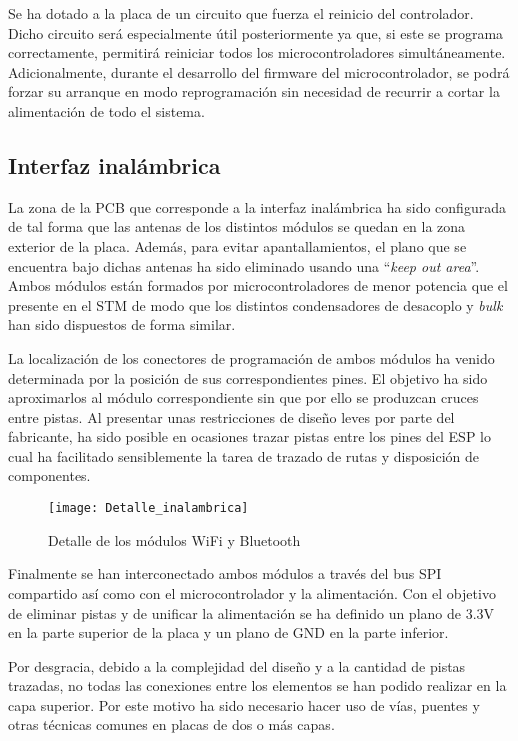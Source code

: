 Se ha dotado a la placa de un circuito que fuerza el reinicio del controlador. Dicho circuito será especialmente útil posteriormente ya que, si este se programa correctamente, permitirá reiniciar todos los microcontroladores simultáneamente. Adicionalmente, durante el desarrollo del firmware del microcontrolador, se podrá forzar su arranque en modo reprogramación sin necesidad de recurrir a cortar la alimentación de todo el sistema.

\subsection{Interfaz inalámbrica\label{sec:PCB_inalambrica}}

La zona de la \acrshort{PCB} que corresponde a la interfaz inalámbrica ha sido configurada de tal forma que las antenas de los distintos módulos se quedan en la zona exterior de la placa. Además, para evitar apantallamientos, el plano que se encuentra bajo dichas antenas ha sido eliminado usando una ``\textit{keep out area}''. Ambos módulos están formados por microcontroladores de menor potencia que el presente en el STM de modo que los distintos condensadores de desacoplo y \textit{bulk} han sido dispuestos de forma similar.

La localización de los conectores de programación de ambos módulos ha venido determinada por la posición de sus correspondientes pines. El objetivo ha sido aproximarlos al módulo correspondiente sin que por ello se produzcan cruces entre pistas. Al presentar unas restricciones de diseño leves por parte del fabricante, ha sido posible en ocasiones trazar pistas entre los pines del ESP lo cual ha facilitado sensiblemente la tarea de trazado de rutas y disposición de componentes.

\clearpage

\begin{figure} [h]
    \centering
    \texttt{[image: Detalle\_inalambrica]}
    \caption{Detalle de los módulos WiFi y Bluetooth}
    \label{fig:Detalle_inalambrica}
\end{figure}

Finalmente se han interconectado ambos módulos a través del bus SPI compartido así como con el microcontrolador y la alimentación. Con el objetivo de eliminar pistas y de unificar la alimentación se ha definido un plano de 3.3V en la parte superior de la placa y un plano de GND en la parte inferior. 

Por desgracia, debido a la complejidad del diseño y a la cantidad de pistas trazadas, no todas las conexiones entre los elementos se han podido realizar en la capa superior. Por este motivo ha sido necesario hacer uso de vías, puentes y otras técnicas comunes en placas de dos o más capas.

